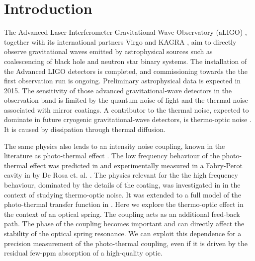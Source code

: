 \newcommand{\tcr}{\textcolor{red}}
\newcommand{\tcb}{\textcolor{blue}}
\newcommand{\tcm}{\textcolor{magenta}}
\newcommand{\tcg}{\textcolor{green}}
\newcommand{\tcp}{\textcolor{purple}}
\newcommand{\irm}{\mathrm{i}}

\newcommand{\del}[0]{{}_{{}^\triangle}\!}
\newcommand{\vk}[0]{{\bf k}}
\newcommand{\w}[0]{{\rm w}}
\newcommand{\omg}[0]{{{\Omega}}}
\newcommand{\eq}[1]{equation \ref{#1}}

\section{Introduction}
The Advanced Laser Interferometer Gravitational-Wave Observatory (aLIGO) \cite{Harry2010}, together with its international partners Virgo \cite{2013ASPC..467..151D} and KAGRA \cite{Somiya:2011np}, aim to directly observe gravitational waves emitted by astrophysical sources such as coalescencing of black hole and neutron star binary systems. The installation 
of the Advanced LIGO detectors is completed, and commissioning towards the the first observation run is ongoing. Preliminary astrophysical data is expected in 2015. The sensitivity of those advanced gravitational-wave detectors in the observation band is limited by the quantum noise of light and the thermal noise associated with mirror coatings. A contributor to the thermal noise, expected to dominate in future cryogenic gravitational-wave detectors, is thermo-optic noise \cite{Braginsky2000303, PhysRevD.63.082003, PhysRevD.78.102003}. It is caused by dissipation through thermal diffusion.

The same physics also leads to an intensity noise coupling, known in the literature as photo-thermal effect \cite{Braginsky19991}. The low frequency behaviour of the photo-thermal effect was predicted in \cite{PhysRevD.63.082003} and experimentally measured in a Fabry-Perot cavity in by De Rosa et. al. \cite{PhysRevLett.89.237402}. The physics relevant for the the high frequency behaviour, dominated by the details of the coating, was investigated in \cite{PhysRevD.78.102003} in the context of studying thermo-optic noise. It was extended to a full model of the photo-thermal transfer function in \cite{PhysRevD.91.023010}.
Here we explore the thermo-optic effect in the context of an optical spring. The coupling acts as an additional feed-back path. The phase of the coupling becomes important and can directly affect the stability of the optical spring resonance. We can exploit this dependence for a precision measurement of the photo-thermal coupling, even if it is driven by the residual few-ppm absorption of a high-quality optic.

